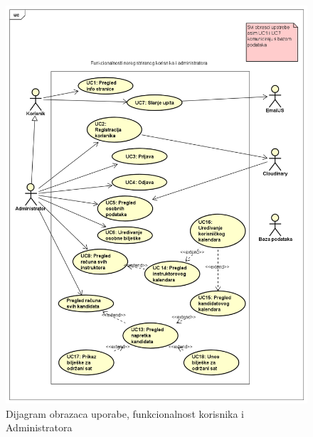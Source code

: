   \begin{figure}[H]
		\includegraphics[width=\textwidth]{slike/UseCase Diagram1.png}
		\centering
		\vspace{-1cm}
		\caption{Dijagram obrazaca uporabe, funkcionalnost korisnika i Administratora}
		\label{fig:promjene}
	\end{figure}

 






